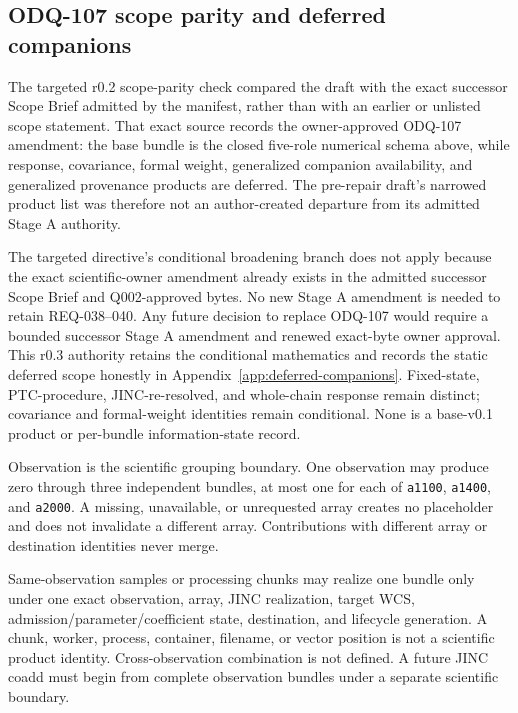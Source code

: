 \documentclass[11pt]{article}
\begin{document}
\subsection{ODQ-107 scope parity and deferred companions}
\label{sec:scope-parity}

The targeted r0.2 scope-parity check compared the draft with the exact
successor Scope Brief admitted by the manifest, rather than with an earlier or
unlisted scope statement.  That exact source records the owner-approved
ODQ-107 amendment: the base bundle is the closed five-role numerical schema
above, while response, covariance, formal weight, generalized companion
availability, and generalized provenance products are deferred.  The
pre-repair draft's narrowed product list was therefore not an author-created departure
from its admitted Stage A authority.

The targeted directive's conditional broadening branch does not apply because
the exact scientific-owner amendment already exists in the admitted successor
Scope Brief and Q002-approved bytes.  No new Stage A amendment is needed to
retain REQ-038--040.  Any future decision to replace ODQ-107 would require a
bounded successor Stage A amendment and renewed exact-byte owner approval.
This r0.3 authority retains the conditional mathematics and records the static
deferred scope honestly in Appendix~\ref{app:deferred-companions}.  Fixed-state,
PTC-procedure, JINC-re-resolved, and whole-chain response remain distinct;
covariance and formal-weight identities remain conditional.  None is a
base-v0.1 product or per-bundle information-state record.

Observation is the scientific grouping boundary.  One observation may
produce zero through three independent bundles, at most one for each of
\texttt{a1100}, \texttt{a1400}, and \texttt{a2000}.  A missing, unavailable, or
unrequested array creates no placeholder and does not invalidate a different
array.  Contributions with different array or destination identities never
merge.

Same-observation samples or processing chunks may realize one bundle only
under one exact observation, array, JINC realization, target WCS,
admission/parameter/coefficient state, destination, and lifecycle generation.
A chunk, worker, process, container, filename, or vector position is not a
scientific product identity.  Cross-observation combination is not defined.
A future JINC coadd must begin from complete observation bundles under a
separate scientific boundary.
\end{document}
